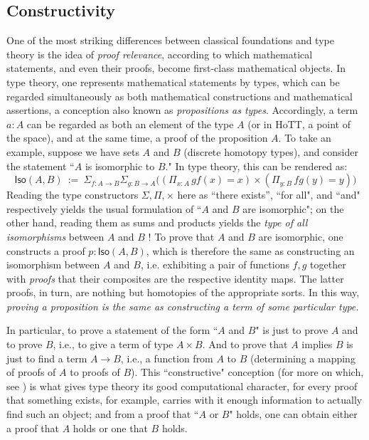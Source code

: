 {%


\subsection*{Constructivity} 


One of the most striking differences between classical foundations and type theory is the idea of \emph{proof relevance}, according to which mathematical statements, and even their proofs, become first-class mathematical objects.  In type theory, one represents mathematical statements by types, which can be regarded simultaneously as both mathematical constructions and mathematical assertions, a conception also known as \emph{propositions as types}.  Accordingly, a term $a : A$ can be regarded as both an element of the type $A$ (or in HoTT, a point of the space), and at the same time, a proof of the proposition $A$.  To take an example, suppose we have sets $A$ and $B$ (discrete homotopy types), and consider the statement ``$A$ is isomorphic to $B$."  In type theory, this can be rendered as:
\[
\mathsf{Iso}(A,B)\ :=\ \Sigma_{f : A\to B}\Sigma_{g : B\to A}\big((\Pi_{x:A}\, gf(x) = x) \times (\Pi_{y:B}\, fg(y) = y)\big)
\]
%
Reading the type constructors $\Sigma, \Pi, \times$  here  as ``there exists'', ``for all", and ``and" respectively yields the usual formulation of ``$A$ and $B$ are isomorphic"; on the other hand, reading them as sums and products yields the \emph{type of all isomorphisms} between $A$ and $B$ !  To prove that $A$ and $B$ are isomorphic, one  constructs a proof $p : \mathsf{Iso}(A,B)$, which is therefore the same  as constructing an isomorphism between $A$ and $B$, i.e. exhibiting a pair of functions $f, g$ together with \emph{proofs} that their composites are the respective identity maps.  The latter proofs, in turn, are nothing but homotopies of the appropriate sorts.  In this way, \emph{proving a proposition is the same as constructing a term of some particular type.}

In particular, to prove a statement of the form ``$A$ and $B$" is just to prove $A$ and to prove $B$, i.e., to give a term of type $A\times B$.  And to prove that $A$ implies $B$ is just to find a term $A\to B$, i.e., a function from $A$ to $B$ (determining a mapping of proofs of $A$ to proofs of $B$).  This ``constructive" conception (for more on which, see \cite{kolmogorov,BHK}) is what gives type theory its good computational character, for every proof that something exists, for example, carries with it enough information to actually find such an object; and from a proof that  ``$A$ or $B$" holds, one can obtain either a proof that $A$ holds or one that $B$ holds.  

}
